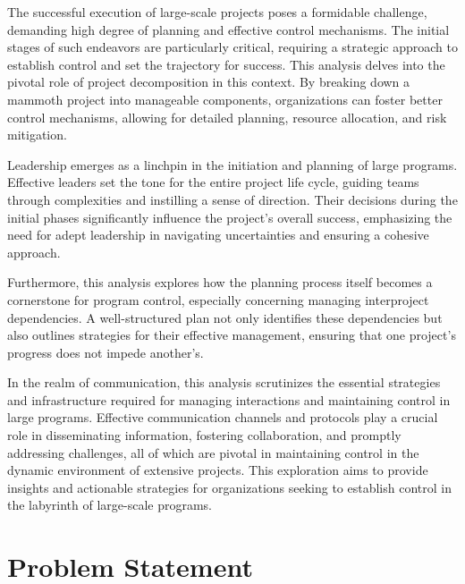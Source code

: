 \documentclass[runningheads]{llncs}
\begin{document}
The successful execution of large-scale projects poses a formidable challenge, demanding high degree of planning and effective control mechanisms. The initial stages of such endeavors are particularly critical, requiring a strategic approach to establish control and set the trajectory for success. This analysis delves into the pivotal role of project decomposition in this context. By breaking down a mammoth project into manageable components, organizations can foster better control mechanisms, allowing for detailed planning, resource allocation, and risk mitigation.

Leadership emerges as a linchpin in the initiation and planning of large programs. Effective leaders set the tone for the entire project life cycle, guiding teams through complexities and instilling a sense of direction. Their decisions during the initial phases significantly influence the project's overall success, emphasizing the need for adept leadership in navigating uncertainties and ensuring a cohesive approach.

Furthermore, this analysis explores how the planning process itself becomes a cornerstone for program control, especially concerning managing interproject dependencies. A well-structured plan not only identifies these dependencies but also outlines strategies for their effective management, ensuring that one project's progress does not impede another's.

In the realm of communication, this analysis scrutinizes the essential strategies and infrastructure required for managing interactions and maintaining control in large programs. Effective communication channels and protocols play a crucial role in disseminating information, fostering collaboration, and promptly addressing challenges, all of which are pivotal in maintaining control in the dynamic environment of extensive projects. This exploration aims to provide insights and actionable strategies for organizations seeking to establish control in the labyrinth of large-scale programs.

\section{Problem Statement}
\end{document}
